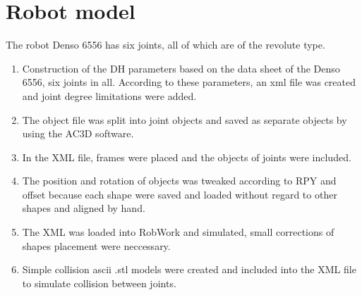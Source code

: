 \section{Robot model}
\label{sec:program}

The robot Denso 6556 has six joints, all of which are of the revolute type.

\begin{enumerate}
	\item Construction of the DH parameters based on the data sheet of the Denso 6556, six joints in all. According to these parameters, an xml file was created and joint degree limitations were added. \\
	\item  The object file was split into joint objects and saved as separate objects by using the AC3D software\cite{ac3d}. \\
	\item  In the XML file, frames were placed and the objects of joints were included. \\
	\item The position and rotation of objects was tweaked according to RPY and offset because each shape were saved and loaded without regard to other shapes and aligned by hand. \\
	\item The XML was loaded into RobWork and simulated, small corrections of shapes placement were neccessary. \\
	\item Simple collision ascii .stl models were created and included into the XML file to simulate collision between joints. \\
\end{enumerate}
